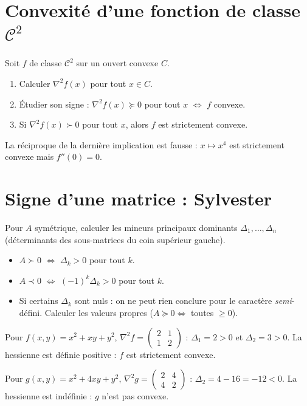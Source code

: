 
\section{Convexité d'une fonction de classe $\mathcal C^2$}

\begin{methode}
Soit $f$ de classe $\mathcal C^2$ sur un ouvert convexe $C$.
\begin{enumerate}[label=\textbf{Étape \arabic*.}]
  \item Calculer $\nabla^2f(x)$ pour tout $x\in C$.
  \item Étudier son signe : $\nabla^2f(x)\succeq0$ pour tout $x$ $\iff$ $f$ convexe.
  \item Si $\nabla^2f(x)\succ0$ pour tout $x$, alors $f$ est strictement convexe.
\end{enumerate}
\end{methode}

\begin{attention}
La réciproque de la dernière implication est fausse : $x\mapsto x^4$ est strictement convexe mais $f''(0)=0$.
\end{attention}

\section{Signe d'une matrice : Sylvester}

\begin{methode}
Pour $A$ symétrique, calculer les mineurs principaux dominants $\Delta_1,\dots,\Delta_n$ (déterminants des sous-matrices du coin supérieur gauche).
\begin{itemize}
  \item $A\succ0$ $\iff$ $\Delta_k>0$ pour tout $k$.
  \item $A\prec0$ $\iff$ $(-1)^k\Delta_k>0$ pour tout $k$.
  \item Si certains $\Delta_k$ sont nuls : on ne peut rien conclure pour le caractère \emph{semi}-défini. Calculer les valeurs propres ($A\succeq0\iff$ toutes $\ge0$).
\end{itemize}
\end{methode}

\begin{exemple}
Pour $f(x,y)=x^2+xy+y^2$, $\nabla^2f=\begin{pmatrix}2&1\\1&2\end{pmatrix}$ : $\Delta_1=2>0$ et $\Delta_2=3>0$. La hessienne est définie positive : $f$ est strictement convexe.

Pour $g(x,y)=x^2+4xy+y^2$, $\nabla^2g=\begin{pmatrix}2&4\\4&2\end{pmatrix}$ : $\Delta_2=4-16=-12<0$. La hessienne est indéfinie : $g$ n'est pas convexe.
\end{exemple}

